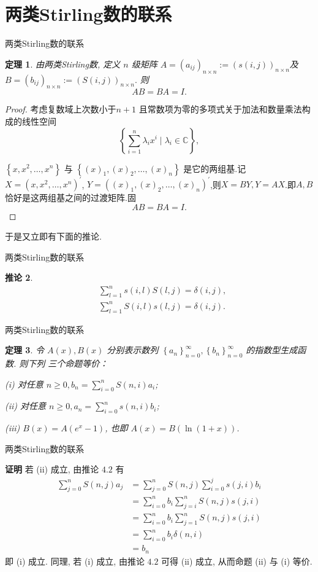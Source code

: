 \documentclass[punct]{ctexbeamer}
\newtheorem{thm}{定理}[section]
\newtheorem{cor}[thm]{推论}
\begin{document}
\section{两类Stirling数的联系}	
\begin{frame}{两类Stirling数的联系}
	\begin{thm}
		由两类Stirling数, 定义 $n$ 级矩阵 $A=\left(a_{i j}\right)_{n \times n}:=(s(i, j))_{n \times n}$及$B=\left(b_{i j}\right)_{n \times n}:=(S(i, j))_{n \times n}.$
		则
		$$AB=BA=I.$$
	\end{thm}
	\pause
	\begin{proof}
		考虑复数域上次数小于$n+1$ 且常数项为零的多项式关于加法和数量乘法构成的线性空间
		$$
		\left\{\sum_{i=1}^n \lambda_i x^i \mid \lambda_i \in \mathbb{C}\right\},
		$$
		
		$\left\{x, x^2, \ldots, x^n\right\}$ 与 $\left\{(x)_1,(x)_2, \ldots,(x)_n\right\}$ 是它的两组基.记$X=(x, x^2, \ldots, x^n)^{'}$,
		$Y=((x)_1,(x)_2, \ldots,(x)_n)^{'}$,则$X=BY,Y=AX$.即$A,B$恰好是这两组基之间的过渡矩阵.固$$AB=BA=I.$$
		
	\end{proof}
	
	于是又立即有下面的推论.
\end{frame}
\begin{frame}{两类Stirling数的联系}
	\begin{cor}
		$$
		\begin{aligned}
		&\sum_{l=1}^n s(i, l) S(l, j)=\delta(i, j), \\
		&\sum_{l=1}^n S(i, l) s(l, j)=\delta(i, j) .
		\end{aligned}
		$$
	\end{cor}
\end{frame}
\begin{frame}{两类Stirling数的联系}
	\begin{thm}
		令 $A(x), B(x)$ 分别表示数列 $\left\{a_n\right\}_{n=0}^{\infty},\left\{b_n\right\}_{n=0}^{\infty}$ 的指数型生成函数. 则下列 三个命题等价：
		
		(i) 对任意 $n \geq 0, b_n=\sum_{i=0}^n S(n, i) a_i$;
		
		(ii) 对任意 $n \geq 0, a_n=\sum_{i=0}^n s(n, i) b_i$;
		
		(iii) $B(x)=A\left(e^x-1\right)$, 也即 $A(x)=B(\ln (1+x))$.
	\end{thm}
\end{frame}
\begin{frame}{两类Stirling数的联系}
	
	{\bf 证明}
若 (ii) 成立, 由推论 $4.2$ 有
$$
\begin{aligned}
\sum_{j=0}^n S(n, j) a_j &=\sum_{j=0}^n S(n, j) \sum_{i=0}^j s(j, i) b_i \\
&=\sum_{i=0}^n b_i \sum_{j=i}^n S(n, j) s(j, i) \\
&=\sum_{i=0}^n b_i \sum_{j=1}^n S(n, j) s(j, i) \\
&=\sum_{i=0}^n b_i \delta(n, i) \\
&=b_n
\end{aligned}
$$
即 (i) 成立. 同理, 若 (i) 成立, 由推论 $4.2$ 可得 (ii) 成立, 从而命题 (ii) 与 (i) 等价.
\end{frame}
\end{document}
